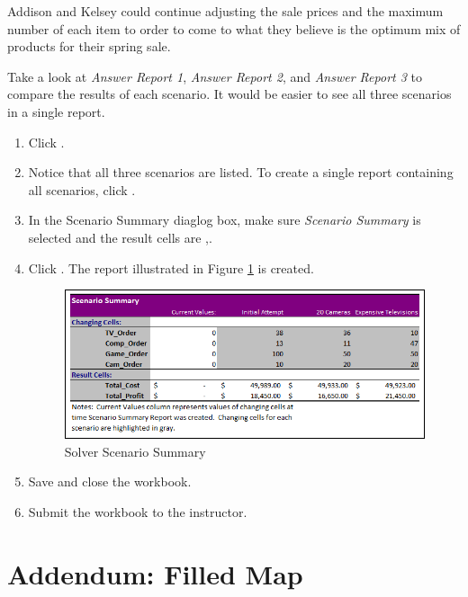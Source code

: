 Addison and Kelsey could continue adjusting the sale prices and the maximum number of each item to order to come to what they believe is the optimum mix of products for their spring sale.

Take a look at \textit{Answer Report 1}, \textit{Answer Report 2}, and \textit{Answer Report 3} to compare the results of each scenario. It would be easier to see all three scenarios in a single report.

\begin{enumerate}[resume]
	\item Click .
	\item Notice that all three scenarios are listed. To create a single report containing all scenarios, click .
	\item In the Scenario Summary diaglog box, make sure \textit{Scenario Summary} is selected and the result cells are ,.
	\item Click . The report illustrated in Figure \ref{08:fig83} is created.

	\begin{figure}[H]
		\centering
		\includegraphics[width=\maxwidth{.95\linewidth}]{gfx/ch08_fig83}
		\caption{Solver Scenario Summary}
		\label{08:fig83}
	\end{figure}

	\item Save and close the  workbook.
	\item Submit the  workbook to the instructor.
\end{enumerate}

\section{Addendum: Filled Map}

